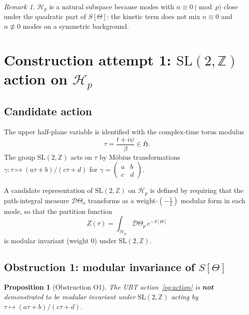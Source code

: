 \documentclass[12pt,a4paper]{article}
\newtheorem{proposition}[theorem]{Proposition}
\theoremstyle{definition}
\theoremstyle{remark}
\newtheorem{remark}[theorem]{Remark}
\newcommand{\SL}{\mathrm{SL}}
\newcommand{\bH}{\mathfrak{H}}     %
\newcommand{\ZZ}{\mathbb{Z}}
\newcommand{\Hp}{\mathcal{H}_p}
\begin{document}
\begin{remark}
$\Hp$ is a natural subspace because modes with $n\equiv 0\pmod{p}$ close
under the quadratic part of $S[\Theta]$: the kinetic term does not mix
$n\equiv 0$ and $n\not\equiv 0$ modes on a symmetric background.
\end{remark}

\section{Construction attempt 1: $\SL(2,\ZZ)$ action on $\Hp$}
\label{sec:sl2z}

\subsection{Candidate action}

The upper half-plane variable is identified with the complex-time torus
modulus
\begin{equation}
  \tau = \frac{t + i\psi}{\beta} \in \bH.
  \label{eq:tau}
\end{equation}
The group $\SL(2,\ZZ)$ acts on $\tau$ by Möbius transformations
$\gamma\colon\tau\mapsto(a\tau+b)/(c\tau+d)$ for
$\gamma=\left(\begin{smallmatrix}a&b\\c&d\end{smallmatrix}\right)$.

A candidate representation of $\SL(2,\ZZ)$ on $\Hp$ is defined by
requiring that the path-integral measure $\mathcal{D}\Theta_n$ transforms
as a weight-$(-\tfrac{1}{2})$ modular form in each mode, so that the
partition function
\[
  Z(\tau) = \int_{\Hp} \mathcal{D}\Theta_p\,e^{-S[\Theta]}
\]
is modular invariant (weight 0) under $\SL(2,\ZZ)$.

\subsection{Obstruction 1: modular invariance of $S[\Theta]$}

\begin{proposition}[Obstruction O1]
\label{prop:O1}
The UBT action~\eqref{eq:action} is \textbf{not} demonstrated to be
modular invariant under $\SL(2,\ZZ)$ acting by $\tau\mapsto(a\tau+b)/(c\tau+d)$.
\end{proposition}
\end{document}
